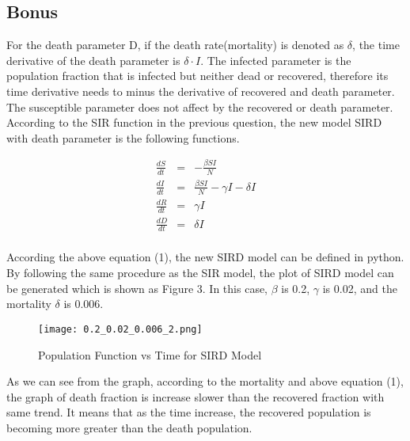 \documentclass[12pt]{article}
\begin{document}
\subsection{Bonus}
For the death parameter D, if the death rate(mortality) is denoted as $\delta$, the time derivative of the death parameter is $\delta \cdot I$. The infected parameter is the population fraction that is infected but neither dead or recovered, therefore its time derivative needs to minus the derivative of recovered and death parameter. The susceptible parameter does not affect by the recovered or death parameter. According to the SIR function in the previous question, the new model SIRD with death parameter is the following functions. \cite{SIRD}\par
\begin{equation}
\begin{array}{lcl} 
\frac{dS}{dt} &=&-\frac{\beta SI}{N}\\
\frac{dI}{dt}&=&\frac{\beta SI}{N}-\gamma I - \delta I\\
\frac{dR}{dt}&=&\gamma I\\
\frac{dD}{dt}&=&\delta I\\
\end{array}
\end{equation}

According the above equation (1), the new SIRD model can be defined in python. By following the same procedure as the SIR model, the plot of SIRD model can be generated which is shown as Figure 3. In this case, $\beta$ is 0.2, $\gamma$ is 0.02, and the mortality $\delta$ is 0.006. \par

\begin{figure}[h]
\centering
\texttt{[image: 0.2\_0.02\_0.006\_2.png]}
\caption{Population Function vs Time for SIRD Model}
\label{fig 1}
\end{figure}

As we can see from the graph, according to the mortality and above equation (1), the graph of death fraction is increase slower than the recovered fraction with same trend. It means that as the time increase, the recovered population is becoming more greater than the death population. \par




\clearpage


\end{document}
